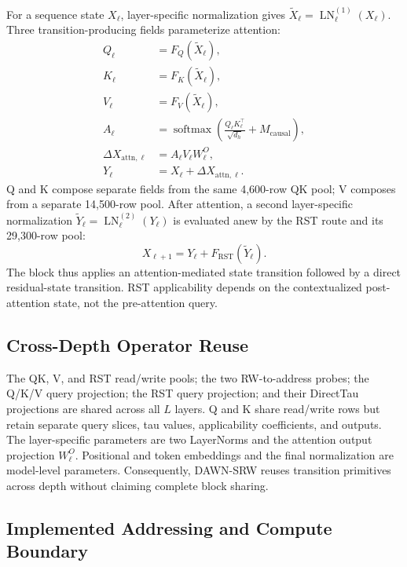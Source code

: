\documentclass{article}
\newcommand{\DAWN}{DAWN-SRW}
\begin{document}
For a sequence state \(X_\ell\), layer-specific normalization gives
\(\widetilde X_\ell=\operatorname{LN}^{(1)}_\ell(X_\ell)\). Three
transition-producing fields parameterize attention:
\begin{align}
Q_\ell&=F_Q(\widetilde X_\ell),\nonumber\\
K_\ell&=F_K(\widetilde X_\ell),\nonumber\\
V_\ell&=F_V(\widetilde X_\ell),\nonumber\\
A_\ell&=\operatorname{softmax}\!\left(
\frac{Q_\ell K_\ell^\top}{\sqrt{d_h}}+M_{\mathrm{causal}}\right)
\!,\nonumber\\
\Delta X_{\mathrm{attn},\ell}&=A_\ell V_\ell W^O_\ell,\\
Y_\ell&=X_\ell+\Delta X_{\mathrm{attn},\ell}.
\label{eq:attention}
\end{align}
Q and K compose separate fields from the same 4,600-row QK pool; V composes
from a separate 14,500-row pool. After attention, a second layer-specific
normalization \(\widetilde Y_\ell=\operatorname{LN}^{(2)}_\ell(Y_\ell)\) is
evaluated anew by the RST route and its 29,300-row pool:
\begin{equation}
X_{\ell+1}=Y_\ell+F_{\mathrm{RST}}(\widetilde Y_\ell).
\label{eq:rst}
\end{equation}
The block thus applies an attention-mediated state transition followed by a
direct residual-state transition. RST applicability depends on the
contextualized post-attention state, not the pre-attention query.

\subsection{Cross-Depth Operator Reuse}
\label{sec:reuse}

The QK, V, and RST read/write pools; the two RW-to-address probes; the Q/K/V
query projection; the RST query projection; and their DirectTau projections
are shared across all \(L\) layers. Q and K share read/write rows but retain
separate query slices, tau values, applicability coefficients, and outputs. The
layer-specific parameters are two LayerNorms and the attention output
projection \(W^O_\ell\). Positional and token embeddings and the final
normalization are model-level parameters. Consequently, \DAWN{} reuses
transition primitives across depth without claiming complete block sharing.

\subsection{Implemented Addressing and Compute Boundary}
\label{sec:implemented-boundary}
\end{document}
